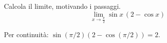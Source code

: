 
\begin{esercizio}
Calcola il limite, motivando i passaggi.
\[
        \lim_{x\to \frac{\pi}{2}} \sin x\,(2-\cos x)
    \]
\end{esercizio}

\begin{soluzione}
Per continuità: $\sin(\pi/2)(2-\cos(\pi/2))=2$.
\end{soluzione}
